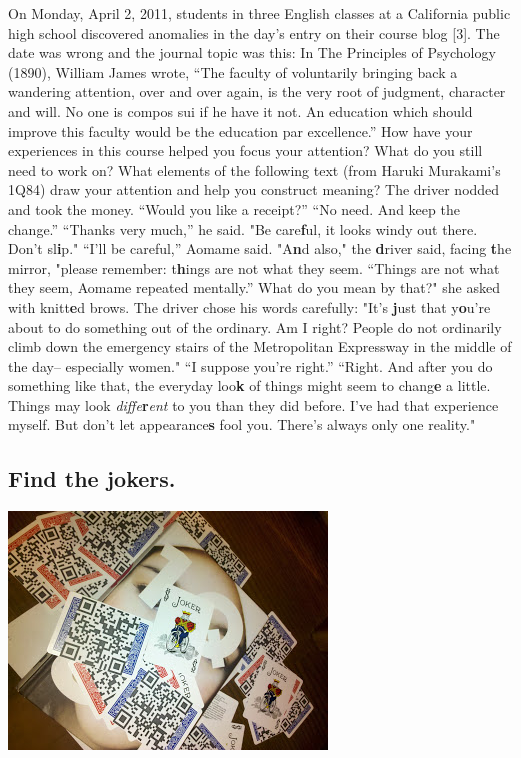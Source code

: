 On Monday, April 2, 2011, students in three English classes at a
California public high school discovered anomalies in the day's entry on
their course blog {[}3{]}. The date was wrong and the journal topic was
this: In The Principles of Psychology (1890), William James wrote, ``The
faculty of voluntarily bringing back a wandering attention, over and
over again, is the very root of judgment, character and will. No one is
compos sui if he have it not. An education which should improve this
faculty would be the education par excellence.'' How have your
experiences in this course helped you focus your attention? What do you
still need to work on? What elements of the following text (from Haruki
Murakami's 1Q84) draw your attention and help you construct meaning? The
driver nodded and took the money. ``Would you like a receipt?'' ``No
need. And keep the change.'' ``Thanks very much,'' he said. "Be
care\textbf{f}ul, it looks windy out there. Don't sl\textbf{i}p." ``I'll
be careful,'' Aomame said. "A\textbf{n}d also," the \textbf{d}river
said, facing \textbf{t}he mirror, "please remember: t\textbf{h}ings are
not what they seem. ``Things are not what they seem, Aomame repeated
mentally.'' What do you mean by that?" she asked with knitt\textbf{e}d
brows. The driver chose his words carefully: "It's \textbf{j}ust that
y\textbf{o}u're about to do something out of the ordinary. Am I right?
People do not ordinarily climb down the emergency stairs of the
Metropolitan Expressway in the middle of the day-- especially women."
``I suppose you're right.'' ``Right. And after you do something like
that, the everyday loo\textbf{k} of things might seem to chang\textbf{e}
a little. Things may look \emph{diffe}\textbf{r}\hspace{-.1em}\emph{ent} to you than they did
before. I've had that experience myself. But don't let
appearance\textbf{s} fool you. There's always only one reality."

\subsection{Find the jokers.}

\begin{center}
\includegraphics{../pictures/jokers.jpg}
\end{center}

